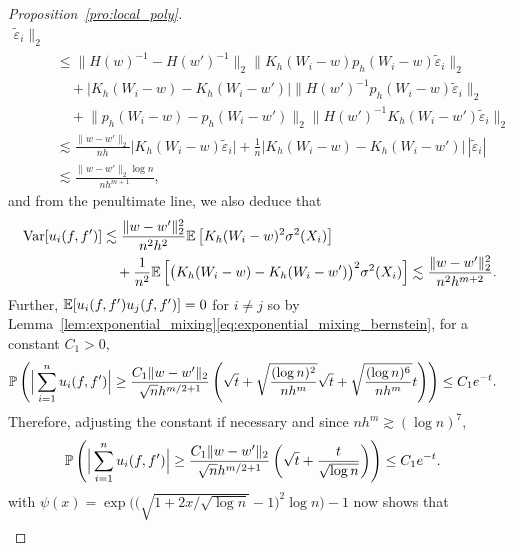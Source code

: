 \begin{proof}[Proposition~\ref{pro:local_poly}]
\begin{align*}
    \tilde\varepsilon_i
    \big\|_2 \\
    &\leq
    \big\| H(w)^{-1} - H(w')^{-1} \big\|_2
    \big\| K_h(W_i-w) p_h(W_i-w)
    \tilde\varepsilon_i
    \big\|_2 \\
    &\quad+
    \big| K_h(W_i-w) - K_h(W_i-w') \big|
    \big\| H(w')^{-1} p_h(W_i-w)
    \tilde\varepsilon_i
    \big\|_2 \\
    &\quad+
    \big\| p_h(W_i-w) - p_h(W_i-w') \big\|_2
    \big\| H(w')^{-1} K_h(W_i-w')
    \tilde\varepsilon_i \big\|_2 \\
    &\lesssim
    \frac{\|w-w'\|_2}{n h}
    \big| K_h(W_i-w) \tilde\varepsilon_i \big|
    + \frac{1}{n}
    \big| K_h(W_i-w) - K_h(W_i-w') \big|
    \,|\tilde\varepsilon_i| \\
    &\lesssim
    \frac{\|w-w'\|_2 \log n}{n h^{m+1}},
  \end{align*}
  and from the penultimate line, we also deduce that
  \begin{align*}
    \Var[u_i(f,f')]
    &\lesssim
    \frac{\|w-w'\|_2^2}{n^2h^2}
    \E\left[
      K_h(W_i-w)^2 \sigma^2(X_i)
    \right] \\
    &\quad+
    \frac{1}{n^2}
    \E\left[
      \big( K_h(W_i-w) - K_h(W_i-w') \big)^2
      \sigma^2(X_i)
    \right]
    \lesssim
    \frac{\|w-w'\|_2^2}{n^2h^{m+2}}.
  \end{align*}
  Further, $\E[u_i(f,f') u_j(f,f')] = 0$ for $i \neq j$ so
  by Lemma~\ref{lem:exponential_mixing}\ref{eq:exponential_mixing_bernstein},
  for a constant $C_1>0$,
  \begin{align*}
    \P\left(
      \Big| \sum_{i=1}^n u_i(f,f') \Big|
      \geq \frac{C_1 \|w-w'\|_2}{\sqrt n h^{m/2+1}}
      \left(
        \sqrt{t}
        + \sqrt{\frac{(\log n)^2}{n h^m}} \sqrt t
        + \sqrt{\frac{(\log n)^6}{n h^m}} t
      \right)
    \right)
    &\leq
    C_1 e^{-t}.
  \end{align*}
  Therefore, adjusting the constant if necessary
  and since $n h^{m} \gtrsim (\log n)^7$,
  \begin{align*}
    \P\left(
      \Big| \sum_{i=1}^n u_i(f,f') \Big|
      \geq
      \frac{C_1 \|w-w'\|_2}{\sqrt{n} h^{m/2+1}}
      \left(
        \sqrt{t} + \frac{t}{\sqrt{\log n}}
      \right)
    \right)
    &\leq
    C_1 e^{-t}.
  \end{align*}
   with
  $\psi(x) =
  \exp\Big(\big(\sqrt{1+2 x / \sqrt{\log n}}-1 \big)^2
  \log n \Big)-1$
  now shows that
  \begin{align*}

\end{align*}
\end{proof}
